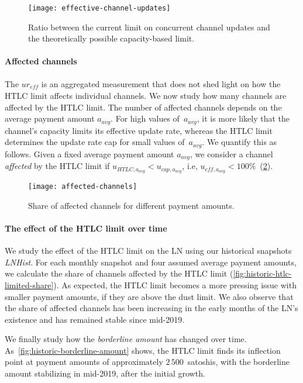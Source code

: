 \begin{figure}[tb]
	\centering
	\texttt{[image: effective-channel-updates]}
	\caption{Ratio between the current limit on concurrent channel updates and the theoretically possible capacity-based limit.}
	\label{fig:effective-channel-updates}
\end{figure}

\paragraph{Affected channels}
The $ur_\textit{eff}$ is an aggregated measurement that does not shed light on how the HTLC limit affects individual channels.
We now study how many channels are affected by the HTLC limit.
The number of affected channels depends on the average payment amount $a_\textit{avg}$.
For high values of~$a_\textit{avg}$, it is more likely that the channel's capacity limits its effective update rate, whereas the HTLC limit determines the update rate cap for small values of~$a_\textit{avg}$.
We quantify this as follows.
Given a fixed average payment amount $a_\textit{avg}$, we consider a channel \textit{affected} by the HTLC limit if $u_{\textit{HTLC},a_\textit{avg}} < u_{\textit{cap},a_\textit{avg}}$, i.e, $u_{\textit{eff},a_\textit{avg}} < 100\%$~(\cref{fig:affected-channels}).

\begin{figure}[tb]
	\centering
	\texttt{[image: affected-channels]}
	\caption{Share of affected channels for different payment amounts.}
	\label{fig:affected-channels}
\end{figure}


\paragraph{The effect of the HTLC limit over time}

We study the effect of the HTLC limit on the LN using our historical snapshots \emph{LNHist}.
For each monthly snapshot and four assumed average payment amounts, we calculate the share of channels affected by the HTLC limit (\cref{fig:historic-htlc-limited-share}).
As expected, the HTLC limit becomes a more pressing issue with smaller payment amounts, if they are above the dust limit.
We also observe that the share of affected channels has been increasing in the early months of the LN's existence and has remained stable since mid-2019.

We finally study how the \textit{borderline amount} has changed over time.
As~\cref{fig:historic-borderline-amount} shows, the HTLC limit finds its inflection point at payment amounts of approximately $2\,500$~satoshis, with the borderline amount stabilizing in mid-2019, after the initial growth.

